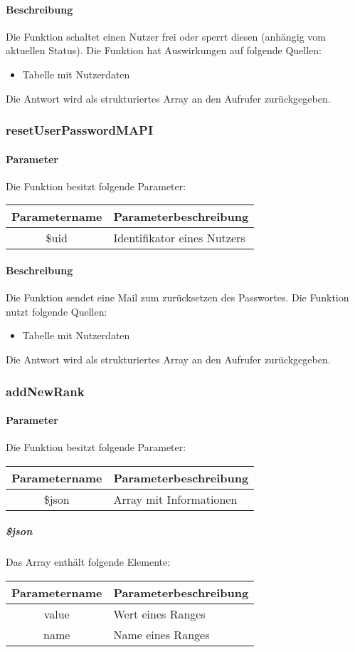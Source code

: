 \paragraph{Beschreibung} Die Funktion schaltet einen Nutzer frei oder sperrt diesen (anhängig vom aktuellen Status). Die Funktion hat Auswirkungen auf folgende Quellen:
\begin{itemize}
	\item Tabelle mit Nutzerdaten
\end{itemize}
Die Antwort wird als strukturiertes Array an den Aufrufer zurückgegeben.
\subsubsection{resetUserPasswordMAPI}
\paragraph{Parameter} Die Funktion besitzt folgende Parameter:
\begin{table}[H]
	\begin{tabular}{|c|p{11cm}|}
		\hline
		\textbf{Parametername} & \textbf{Parameterbeschreibung} \\ \hline
		\$uid & Identifikator eines Nutzers \\ \hline
	\end{tabular}
\end{table}
\paragraph{Beschreibung} Die Funktion sendet eine Mail zum zurücksetzen des Passwortes. Die Funktion nutzt folgende Quellen:
\begin{itemize}
	\item Tabelle mit Nutzerdaten
\end{itemize}
Die Antwort wird als strukturiertes Array an den Aufrufer zurückgegeben.
\subsubsection{addNewRank}
\paragraph{Parameter} Die Funktion besitzt folgende Parameter:
\begin{table}[H]
	\begin{tabular}{|c|p{11cm}|}
		\hline
		\textbf{Parametername} & \textbf{Parameterbeschreibung} \\ \hline
		\$json & Array mit Informationen \\ \hline
	\end{tabular}
\end{table}
\subparagraph{\$json}Das Array enthält folgende Elemente:
\begin{table}[H]
	\begin{tabular}{|c|p{11cm}|}
		\hline
		\textbf{Parametername} & \textbf{Parameterbeschreibung} \\ \hline
		value & Wert eines Ranges \\ \hline
		name  & Name eines Ranges \\ \hline
	\end{tabular}
\end{table}
